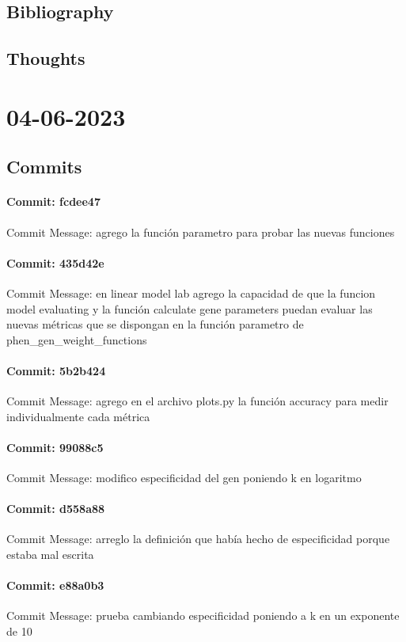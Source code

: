 \documentclass{article}
\begin{document}
\subsection{Bibliography}
\subsection{Thoughts}

\section{04-06-2023}
\subsection{Commits}
\paragraph{Commit: fcdee47}
Commit Message: agrego la función parametro para probar las nuevas funciones

\paragraph{Commit: 435d42e}
Commit Message: en linear model lab agrego la capacidad de que la funcion model evaluating y la función calculate gene parameters puedan evaluar las nuevas métricas que se dispongan en la función parametro de phen_gen_weight_functions

\paragraph{Commit: 5b2b424}
Commit Message: agrego en el archivo plots.py la función accuracy para medir individualmente cada métrica

\paragraph{Commit: 99088c5}
Commit Message: modifico especificidad del gen poniendo k en logaritmo

\paragraph{Commit: d558a88}
Commit Message: arreglo la definición que había hecho de especificidad porque estaba mal escrita

\paragraph{Commit: e88a0b3}
Commit Message: prueba cambiando especificidad poniendo a k en un exponente de 10
\end{document}
